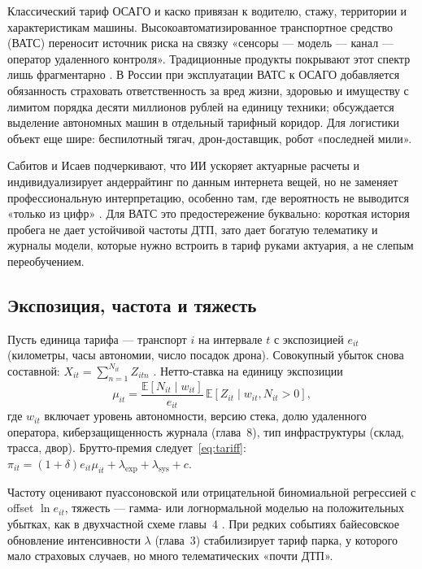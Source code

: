 \documentclass[a4paper,14pt]{extarticle}
\begin{document}
Классический тариф ОСАГО и каско привязан к водителю, стажу, территории и характеристикам машины. Высокоавтоматизированное транспортное средство (ВАТС) переносит источник риска на связку «сенсоры --- модель --- канал --- оператор удаленного контроля». Традиционные продукты покрывают этот спектр лишь фрагментарно \cite{zezina}. В России при эксплуатации ВАТС к ОСАГО добавляется обязанность страховать ответственность за вред жизни, здоровью и имуществу с лимитом порядка десяти миллионов рублей на единицу техники; обсуждается выделение автономных машин в отдельный тарифный коридор. Для логистики объект еще шире: беспилотный тягач, дрон-доставщик, робот «последней мили».

Сабитов и Исаев подчеркивают, что ИИ ускоряет актуарные расчеты и индивидуализирует андеррайтинг по данным интернета вещей, но не заменяет профессиональную интерпретацию, особенно там, где вероятность не выводится «только из цифр» \cite{sabitov}. Для ВАТС это предостережение буквально: короткая история пробега не дает устойчивой частоты ДТП, зато дает богатую телематику и журналы модели, которые нужно встроить в тариф руками актуария, а не слепым переобучением.

\subsection{Экспозиция, частота и тяжесть}

Пусть единица тарифа --- транспорт $i$ на интервале $t$ с экспозицией $e_{it}$ (километры, часы автономии, число посадок дрона). Совокупный убыток снова составной: $X_{it}=\sum_{n=1}^{N_{it}} Z_{itn}$ \cite{shvedov}. Нетто-ставка на единицу экспозиции
\begin{equation}
\mu_{it}=\frac{\mathbb{E}[N_{it}\mid w_{it}]}{e_{it}}\,\mathbb{E}[Z_{it}\mid w_{it}, N_{it}>0],
\label{eq:avnet}
\end{equation}
где $w_{it}$ включает уровень автономности, версию стека, долю удаленного оператора, киберзащищенность журнала (глава~8), тип инфраструктуры (склад, трасса, двор). Брутто-премия следует~\eqref{eq:tariff}: $\pi_{it}=(1+\delta)e_{it}\mu_{it}+\lambda_{\mathrm{exp}}+\lambda_{\mathrm{sys}}+c$.

Частоту оценивают пуассоновской или отрицательной биномиальной регрессией с offset $\ln e_{it}$, тяжесть --- гамма- или логнормальной моделью на положительных убытках, как в двухчастной схеме главы~4 \cite{verbeek}. При редких событиях байесовское обновление интенсивности $\lambda$ (глава~3) стабилизирует тариф парка, у которого мало страховых случаев, но много телематических «почти ДТП».
\end{document}
